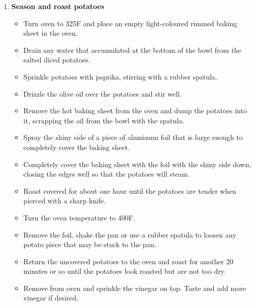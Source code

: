 \documentclass [11pt, letterpaper] {article}
\newcommand \fileName {SweetPotatoPaprika}
\begin{document}
\begin{description}
\begin{enumerate}
	\item {\bf Season and roast potatoes }
	\begin{itemize}
	\item Turn oven to 325F and place an empty light-coloured rimmed baking sheet in the oven.
	\item Drain any water that accumulated at the bottom of the bowl from the salted diced potatoes.
	\item Sprinkle potatoes with paprika, stirring with a rubber spatula.
	\item Drizzle the olive oil over the potatoes and stir well.
        \item Remove the hot baking sheet from the oven and dump the potatoes into it, scrapping the oil from the bowl with the spatula.
        \item Spray the shiny side of a piece of aluminum foil that is large enough to completely cover the baking sheet.
        \item Completely cover the baking sheet with the foil with the shiny side down, closing the edges well so that the potatoes will steam.
        \item Roast covered for about one hour until the potatoes are tender when pierced with a sharp knife.
        \item Turn the oven temperature to 400F.
        \item Remove the foil, shake the pan or use a rubber spatula to loosen any potato piece that may be stuck to the pan.
        \item Return the uncovered potatoes to the oven and roast for another 20 minutes or so until the potatoes look roasted but are not too dry.
        \item Remove from oven and sprinkle the vinegar on top. Taste and add more vinegar if desired.
	\end{itemize}

	\end{enumerate}
\end{description}

\end{document}
